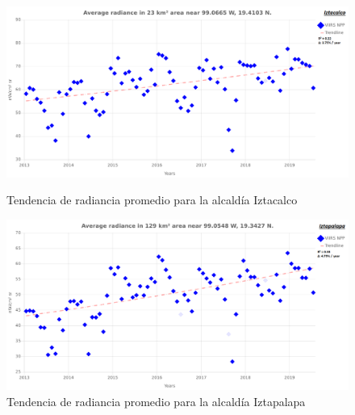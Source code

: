 \begin{figure}[H]
  \centering
    \includegraphics[width=1\textwidth]{IZT}
  \caption{Tendencia de radiancia promedio para la alcaldía Iztacalco}
  \label{radiancetrendsizt}
\vspace{20mm} 
    \includegraphics[width=1\textwidth]{IZP}
  \caption{Tendencia de radiancia promedio para la alcaldía Iztapalapa}
  \label{radiancetrendsizp}
\end{figure}
\blindtext

\newpage

